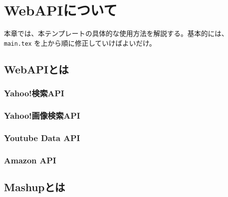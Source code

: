 \chapter{WebAPIについて}
\label{chap:webapi}

本章では、本テンプレートの具体的な使用方法を解説する。基本的には、{\tt main.tex} を上から順に修正していけばよいだけ。 


\section{WebAPIとは}


\subsection{Yahoo!検索API}

\subsection{Yahoo!画像検索API}

\subsection{Youtube Data API}

\subsection{Amazon API}



\section{Mashupとは}
